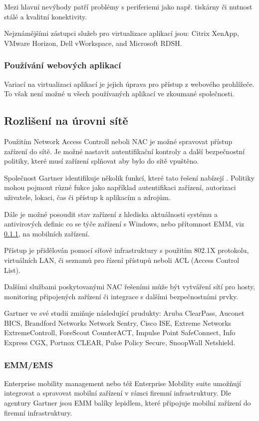  Mezi hlavní nevýhody patří problémy s periferiemi jako např. tiskárny či nutnost stálé a kvalitní konektivity.
 
  Nejznámějšími zástupci služeb pro virtualizace aplikací jsou: Citrix XenApp, VMware Horizon, Dell vWorkspace, and Microsoft RDSH.
  
  
  \subsubsection{Používání webových aplikací}
  Variací na virtualizaci aplikací je jejich úprava pro přístup z webového prohlížeče. To však není možné u všech používaných aplikací ve zkoumané společnosti.
  
 \subsection{Rozlišení na úrovni sítě}
 Použitím Network Access Controll neboli NAC je možné spravovat přístup zařízení do sítě. Je možné nastavit autentifikační kontroly a další bezpečnostní politiky, které musí zařízení splňovat aby bylo do sítě vpuštěno. 
 
 Společnost Gartner identifikuje několik funkcí, které tato řešení nabízejí \cite{GartnerNAC}. Politiky mohou pojmout různé fukce jako například autentifikaci zařízení, autorizaci uživatele, lokaci, čas či přístup k aplikacím a zdrojům.
 
 Dále je možné posoudit stav zařízení z hlediska aktuálnosti systému a antivirových definic co se týče zařízení s Windows, nebo přítomnost EMM, viz \ref{EMM},  na mobilních zařízení.
 
 Přístup je přidělován pomocí síťové infrastruktury s použitím 802.1X protokolu, virtuálních LAN, či seznamů pro řízení přístupů neboli ACL (Access Control List).
 
 Dalšími službami poskytovanými NAC řešeními může být vytváření sítí pro hosty, monitoring připojených zařízení či integrace s dalšími bezpečnostními prvky.
 
 
Gartner ve své studii \cite{GartnerNAC} zmiňuje následující prudukty: Aruba ClearPass, Auconet BICS, Brandford Networks Network Sentry, Cisco ISE, Extreme Networks ExtremeControll, ForeScout CounterACT, Impulse Point SafeConnect, Info Express CGX, Portnox CLEAR, Pulse Policy Secure, SnoopWall Netshield.
 
 

 
 
 \subsubsection{EMM/EMS}\label{EMM}
 Enterprise mobility management nebo též Enterprise Mobility suite umožňují integrovat a spravovat mobilní zařízení v rámci firemní infrastruktury.
 Dle agentury Gartner jsou EMM balíky lepidlem, které připojuje mobilní zařízení do firemní infrastruktury. \cite{Gartner_EMM_2016}
 
